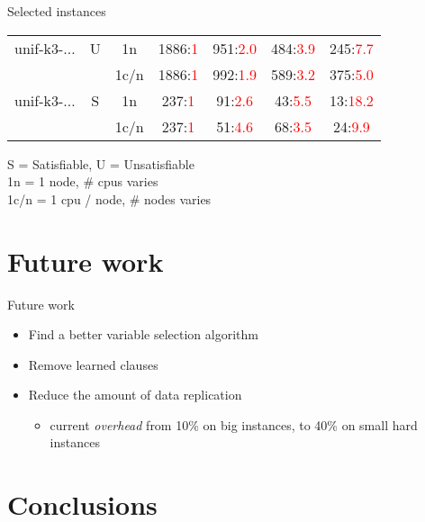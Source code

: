 \documentclass[mathserif,serif]{beamer}
\begin{document}
\begin{frame}{Selected instances}
\begin{tabular}{l | c c | c c c c}
    \hline
    unif-k3-$\ldots$ & U & 1n & 1886:\textcolor{red}{1} & 951:\textcolor{red}{2.0} & 484:\textcolor{red}{3.9} & 245:\textcolor{red}{7.7} \\
                       & & 1c/n & 1886:\textcolor{red}{1} & 992:\textcolor{red}{1.9} & 589:\textcolor{red}{3.2} & 375:\textcolor{red}{5.0} \\
    \hline
    unif-k3-$\ldots$ & S & 1n & 237:\textcolor{red}{1} & 91:\textcolor{red}{2.6} & 43:\textcolor{red}{5.5} & 13:\textcolor{red}{18.2} \\
                       & & 1c/n & 237:\textcolor{red}{1} & 51:\textcolor{red}{4.6} & 68:\textcolor{red}{3.5} & 24:\textcolor{red}{9.9} \\
    \hline
    \hline
  \end{tabular}

  \bigskip
  S = Satisfiable, U = Unsatisfiable \\
  1n = 1 node, \# cpus varies \\
  1c/n = 1 cpu / node, \# nodes varies \\
\end{frame}

\section{Future work}

\begin{frame}{Future work}
  \begin{itemize}
    \item Find a better variable selection algorithm    
    \item Remove learned clauses
    \item Reduce the amount of data replication
    \begin{itemize}
      \item current \emph{overhead} from 10\% on big instances, to 40\% on small hard instances
    \end{itemize}
  \end{itemize}
\end{frame}

\section{Conclusions}
\end{document}

